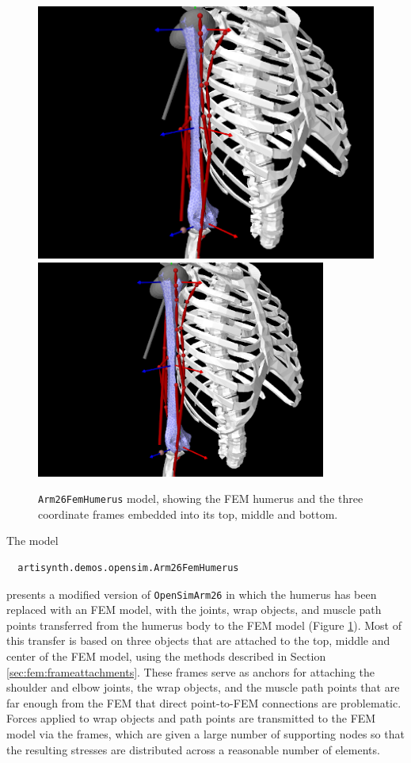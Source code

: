\begin{figure}[ht]
\begin{center}
   \iflatexml 
      \includegraphics[]{images/Arm26FemHumerus} 
   \else 
      \includegraphics[width=3.75in]{images/Arm26FemHumerus} 
   \fi
\end{center}
\caption{{\tt Arm26FemHumerus} model, showing the FEM humerus
and the three coordinate frames embedded into its top, middle and bottom.}
\label{Arm26FemHumerus:fig}
\end{figure}

The model 
\begin{verbatim}
  artisynth.demos.opensim.Arm26FemHumerus
\end{verbatim}
presents a modified version of {\tt OpenSimArm26} in which the humerus has been
replaced with an FEM model, with the joints, wrap objects, and muscle path
points transferred from the humerus body to the FEM model
(Figure \ref{Arm26FemHumerus:fig}). Most of this transfer is based on
three  objects that are attached to the top, middle and
center of the FEM model, using the methods described in Section
\ref{sec:fem:frameattachments}. These frames serve as anchors for attaching the
shoulder and elbow joints, the wrap objects, and the muscle path points that
are far enough from the FEM that direct point-to-FEM connections are
problematic. Forces applied to wrap objects and path points are transmitted to
the FEM model via the frames, which are given a large number of supporting
nodes so that the resulting stresses are distributed across a reasonable number
of elements.

